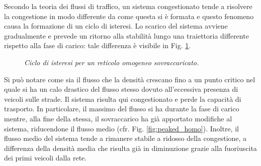 \documentclass[../main.tex]{subfiles}
\begin{document}
Secondo la teoria dei flussi di traffico, un sistema congestionato tende a risolvere la congestione in modo differente da come questa si \`e formata e questo fenomeno causa la formazione di un ciclo di isteresi.
Lo scarico del sistema avviene gradualmente e prevede un ritorno alla stabilit\`a lungo una traiettoria differente rispetto alla fase di carico: tale differenza \`e visibile in Fig. \ref{fig:hysteresys_peaked_homo}.
\begin{figure}[H]
    \hfill
    \caption[Isteresi per un reticolo omogeneo sovraccaricato]{\emph{Ciclo di isteresi per un reticolo omogeneo sovraccaricato.}}
    \label{fig:hysteresys_peaked_homo}
\end{figure}
Si pu\`o notare come sia il flusso che la densit\`a crescano fino a un punto critico nel quale si ha un calo drastico del flusso stesso dovuto all'eccessiva presenza di veicoli sulle strade.
Il sistema risulta qui congestionato e perde la capacit\`a di trasporto.
In particolare, il massimo del flusso si ha durante la fase di carico mentre, alla fine della stessa, il sovraccarico ha gi\`a apportato modifiche al sistema, riducendone il flusso medio (cfr. Fig. \ref{fig:peaked_homo}).
Inoltre, il flusso medio del sistema tende a rimanere stabile a ridosso della congestione, a differenza della densit\`a media che risulta gi\`a in diminuzione grazie alla fuoriuscita dei primi veicoli dalla rete.
\end{document}
